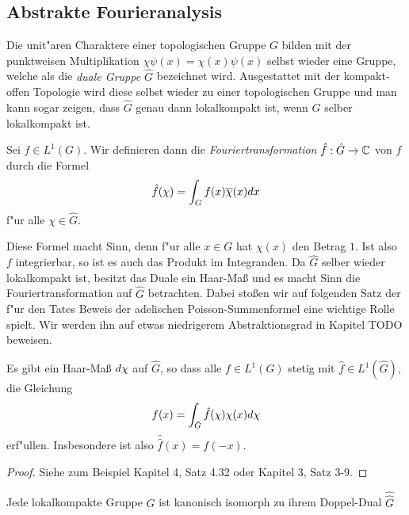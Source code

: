 	
\subsection{Abstrakte Fourieranalysis}
	 Die unit"aren Charaktere einer topologischen Gruppe $G$ bilden mit der punktweisen Multiplikation $\chi\psi (x) = \chi(x) \psi (x)$ selbst wieder eine Gruppe, welche als die \emph{duale Gruppe $\hat{G}$} bezeichnet wird.
	Ausgestattet mit der kompakt-offen Topologie wird diese selbst wieder zu einer topologischen Gruppe und man kann sogar zeigen, dass $\hat{G}$ genau dann lokalkompakt ist, wenn $G$ selber lokalkompakt ist.
	\begin{defi}[Fouriertransformation]
		Sei $f\in L^1(G)$. Wir definieren dann die \emph{Fouriertransformation} $\hat{f}: \hat{G} \to \C$ von $f$ durch die Formel
		\begin{align*}
			\hat{f}(\chi) = \int_G f(x)\conj{\chi}(x) dx
		\end{align*}
		f"ur alle $\chi \in \hat{G}$.
	\end{defi}
	Diese Formel macht Sinn, denn f"ur alle $x \in G$ hat $\chi(x)$ den Betrag $1$. 
	Ist also $f$ integrierbar, so ist es auch das Produkt im Integranden.
	Da $\hat{G}$ selber wieder lokalkompakt ist, besitzt das Duale ein Haar-Maß und es macht Sinn die Fouriertransformation auf $\hat{G}$ betrachten.
	Dabei stoßen wir auf folgenden Satz der f"ur den Tates Beweis der adelischen Poisson-Summenformel eine wichtige Rolle spielt.
	Wir  werden ihn auf etwas niedrigerem Abstraktionsgrad in Kapitel TODO beweisen.
	\begin{satz}
		Es gibt ein Haar-Maß $\dx[\chi]$ auf $\hat{G}$, so dass alle $f \in L^1(G)$ stetig mit $\hat{f} \in L^1(\hat{G})$, die Gleichung
		\begin{align*}
			f(x) = \int_{\hat{G}} \hat{f}(\chi) \chi(x) \dx[\chi]
		\end{align*}
		erf"ullen. Insbesondere ist also $\hat{\hat{f}}(x) = f(-x)$.
	\end{satz}
	\begin{proof}
		Siehe zum Beispiel \cite{folland} Kapitel 4, Satz 4.32 oder \cite{rama} Kapitel 3, Satz 3-9.
	\end{proof}

	\begin{satz}
		Jede lokalkompakte Gruppe $G$ ist kanonisch isomorph zu ihrem Doppel-Dual $\hat{\hat{G}}$ 
	\end{satz}
	
